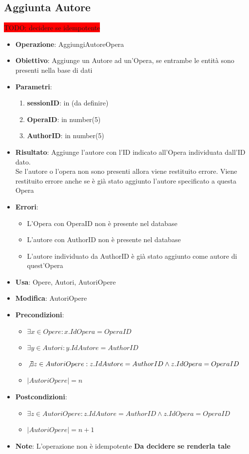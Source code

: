 \documentclass[a4paper,11pt]{article}
\begin{document}
\subsection{Aggiunta Autore} \large \colorbox{red}{TODO: decidere se idempotente}
\begin{itemize}
	\item \textbf{Operazione}: AggiungiAutoreOpera
	\item \textbf{Obiettivo}: Aggiunge un Autore ad un'Opera, se entrambe le entità sono presenti nella base di dati
	\item \textbf{Parametri}:
	\begin{enumerate}
		\item \textbf{sessionID}: in (da definire)
		\item \textbf{OperaID}: in number(5)
		\item \textbf{AuthorID}: in number(5)
	\end{enumerate}
	\item \textbf{Risultato}: Aggiunge l'autore con l'ID indicato all'Opera individuata dall'ID dato.\\
	Se l'autore o l'opera non sono presenti allora viene restituito errore.	Viene restituito errore anche se è già stato aggiunto l'autore specificato a questa Opera
	\item \textbf{Errori}: 
	\begin{itemize}
		\item L'Opera con OperaID non è presente nel database
		\item L'autore con AuthorID non è presente nel database
		\item L'autore individuato da AuthorID è già stato aggiunto come autore di quest'Opera
	\end{itemize}
	\item \textbf{Usa}: Opere, Autori, AutoriOpere
	\item \textbf{Modifica}: AutoriOpere
	\item \textbf{Precondizioni}:
	\begin{itemize}
		\item $\exists x \in Opere : x.IdOpera = OperaID$
		\item $\exists y \in Autori : y.IdAutore = AuthorID$
		\item $\not\exists z \in AutoriOpere : z.IdAutore = AuthorID \land z.IdOpera = OperaID$
		\item $|AutoriOpere| = n$
	\end{itemize}
	\item \textbf{Postcondizioni}:
	\begin{itemize}
		\item $\exists z \in AutoriOpere : z.IdAutore = AuthorID \land z.IdOpera = OperaID$
		\item $|AutoriOpere| = n + 1$
	\end{itemize}
	\item \textbf{Note}: L'operazione non è idempotente \textbf{\color{red} Da decidere se renderla tale}
\end{itemize}
\end{document}
